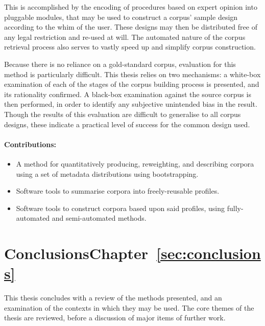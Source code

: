 This is accomplished by the encoding of procedures based on expert opinion into pluggable modules, that may be used to construct a corpus' sample design according to the whim of the user.  These designs may then be distributed free of any legal restriction and re-used at will.  The automated nature of the corpus retrieval process also serves to vastly speed up and simplify corpus construction.

Because there is no reliance on a gold-standard corpus, evaluation for this method is particularly difficult.  This thesis relies on two mechanisms: a white-box examination of each of the stages of the corpus building process is presented, and its rationality confirmed.  A black-box examination against the source corpus is then performed, in order to identify any subjective unintended bias in the result.  Though the results of this evaluation are difficult to generalise to all corpus designs, these indicate a practical level of success for the common design used.

\paragraph{Contributions:}
\begin{itemize}
    \item A method for quantitatively producing, reweighting, and describing corpora using a set of metadata distributions using bootstrapping.
    \item Software tools to summarise corpora into freely-reusable profiles.
    \item Software tools to construct corpora based upon said profiles, using fully-automated and semi-automated methods.
\end{itemize}


\section*{Conclusions\hfill{}Chapter~\ref{sec:conclusions}}
This thesis concludes with a review of the methods presented, and an examination of the contexts in which they may be used.  The core themes of the thesis are reviewed, before a discussion of major items of further work.


